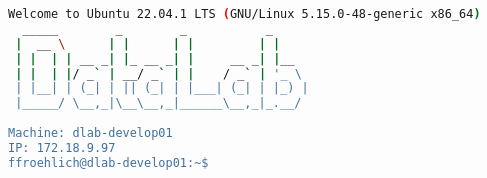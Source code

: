 \begin{lstlisting}[caption=Prompt von \texttt{dlab-develop01}, label=promtdevelop01, language=bash, keywordstyle=\color{black}, commentstyle=\color{black}, stringstyle=\color{black}]
Welcome to Ubuntu 22.04.1 LTS (GNU/Linux 5.15.0-48-generic x86_64)
  _____        _        _           _
 |  __ \      | |      | |         | |
 | |  | | __ _| |_ __ _| |     __ _| |__
 | |  | |/ _` | __/ _` | |    / _` | '_ \
 | |__| | (_| | || (_| | |___| (_| | |_) |
 |_____/ \__,_|\__\__,_|______\__,_|_.__/
 
Machine: dlab-develop01
IP: 172.18.9.97
ffroehlich@dlab-develop01:~$
\end{lstlisting}